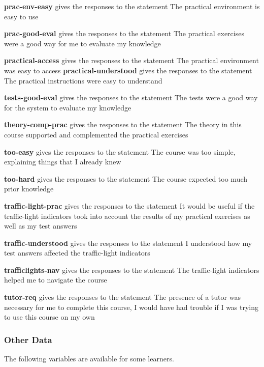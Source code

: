 \documentclass[12pt,twoside]{article}
\begin{document}
\textbf{prac{}-env{}-easy} gives the responses to the statement
{\textquotedbl}The practical environment is easy to use{\textquotedbl} 

\textbf{prac{}-good{}-eval} gives the responses to the statement
{\textquotedbl}The practical exercises were a good way for me to
evaluate my knowledge{\textquotedbl} 

\textbf{practical{}-access} gives the responses to the statement
{\textquotedbl}The practical environment was easy to
access{\textquotedbl}\newline
\textbf{practical{}-understood} gives the responses to the statement
{\textquotedbl}The practical instructions were easy to
understand{\textquotedbl} 

\textbf{tests{}-good{}-eval} gives the responses to the statement
{\textquotedbl}The tests were a good way for the system to evaluate my
knowledge{\textquotedbl} 

\textbf{theory{}-comp{}-prac} gives the responses to the statement
{\textquotedbl}The theory in this course supported and complemented the
practical exercises{\textquotedbl} 

\textbf{too{}-easy} gives the responses to the statement
{\textquotedbl}The course was too simple, explaining things that I
already knew{\textquotedbl} 

\textbf{too{}-hard} gives the responses to the statement
{\textquotedbl}The course expected too much prior
knowledge{\textquotedbl} 

\textbf{traffic{}-light{}-prac} gives the responses to the statement
{\textquotedbl}It would be useful if the traffic{}-light indicators
took into account the results of my practical exercises as well as my
test answers{\textquotedbl} 

\textbf{traffic{}-understood} gives the responses to the statement
{\textquotedbl}I understood how my test answers affected the
traffic{}-light indicators{\textquotedbl} 

\textbf{trafficlights{}-nav} gives the responses to the statement
{\textquotedbl}The traffic{}-light indicators helped me to navigate the
course{\textquotedbl} 

\textbf{tutor{}-req} gives the responses to the statement
{\textquotedbl}The presence of a tutor was necessary for me to complete
this course, I would have had trouble if I was trying to use this
course on my own{\textquotedbl} 

\subsubsection[Other Data ]{\textrm{Other Data} }
The following variables are available for some learners. 
\end{document}
